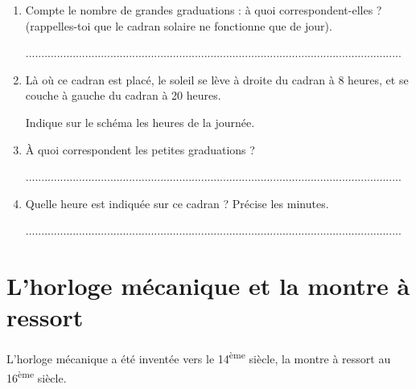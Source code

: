 \documentclass[a4paper,11pt]{article}
\begin{document}
\begin{enumerate}
	\item Compte le nombre de grandes graduations : à quoi correspondent-elles ? (rappelles-toi que le cadran solaire ne fonctionne que de jour). \vspace{0.5em}

	      ........................................................................................................................
	\item Là où ce cadran est placé, le soleil se lève à droite du cadran à 8 heures, et se couche à gauche du cadran à 20 heures.

	      Indique sur le schéma les heures de la journée.
	\item À quoi correspondent les petites graduations ? \vspace{0.5em}

	      ........................................................................................................................
	\item Quelle heure est indiquée sur ce cadran ? Précise les minutes. \vspace{0.5em}

	      ........................................................................................................................
\end{enumerate}

\newpage

\section{L'horloge mécanique et la montre à ressort}

\begin{greybox}[frametitle={Point historique}]
	L'horloge mécanique a été inventée vers le 14\textsuperscript{ème} siècle, la montre à ressort au 16\textsuperscript{ème} siècle.
\end{greybox}
\end{document}
